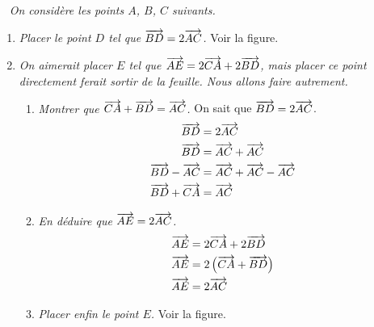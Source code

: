 \documentclass[12pt]{article}
\begin{document}
\begin{exercice}~
  \emph{On considère les points $A$, $B$, $C$ suivants.}
  \begin{center}
  \end{center}
  \begin{enumerate}
    \item \emph{Placer le point $D$ tel que $\overrightarrow{BD}=2\overrightarrow{AC}$.} Voir la figure.
    \item \emph{On aimerait placer $E$ tel que $\overrightarrow{AE}=2\overrightarrow{CA}+2\overrightarrow{BD}$, mais placer ce point directement ferait sortir de la feuille. Nous allons faire autrement.}
      \begin{enumerate}
        \item \emph{Montrer que $\overrightarrow{CA}+\overrightarrow{BD}=\overrightarrow{AC}$.} On sait que $\overrightarrow{BD}=2\overrightarrow{AC}$.
          \begin{align*}
            \overrightarrow{BD} &= 2\overrightarrow{AC} \\
            \overrightarrow{BD} &= \overrightarrow{AC} + \overrightarrow{AC} \\
            \overrightarrow{BD} - \overrightarrow{AC} &= \overrightarrow{AC} + \overrightarrow{AC} - \overrightarrow{AC} \\
            \overrightarrow{BD} + \overrightarrow{CA} &= \overrightarrow{AC} \\
          \end{align*}
        \item \emph{En déduire que $\overrightarrow{AE}=2\overrightarrow{AC}$.}
          \begin{align*}
            \overrightarrow{AE} &= 2\overrightarrow{CA}+2\overrightarrow{BD} \\
            \overrightarrow{AE} &= 2\left(\overrightarrow{CA}+\overrightarrow{BD}\right) \\
            \overrightarrow{AE} &= 2\overrightarrow{AC} \\
          \end{align*}
        \item \emph{Placer enfin le point $E$.} Voir la figure.
      \end{enumerate}
  \end{enumerate}

\end{exercice}
\end{document}
